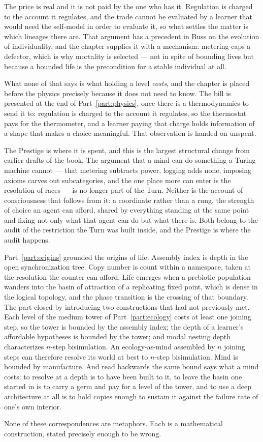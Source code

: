 The price is real and it is not paid by the one who has it.
Regulation is charged to the account it regulates, and the trade cannot
be evaluated by a learner that would need the self-model in order to
evaluate it, so what settles the matter is which lineages there are.
That argument has a precedent in Buss on the evolution of individuality,
and the chapter supplies it with a mechanism: metering caps a defector,
which is why mortality is selected --- not in spite of bounding lives but
because a bounded life is the precondition for a stable individual at
all.

What none of that says is what holding a level \emph{costs}, and the
chapter is placed before the physics precisely because it does not need
to know.
The bill is presented at the end of Part~\ref{part:physics}, once there
is a thermodynamics to send it to: regulation is charged to the account
it regulates, so the thermostat pays for the thermometer, and a learner
paying that charge holds information of a shape that makes a choice
meaningful.
That observation is handed on unspent.

The Prestige is where it is spent, and this is the largest structural
change from earlier drafts of the book.
The argument that a mind can do something a Turing machine cannot ---
that metering subtracts power, logging adds none, imposing axioms carves
out subcategories, and the one place more can enter is the resolution of
races --- is no longer part of the Turn.
Neither is the account of consciousness that follows from it: a
coordinate rather than a rung, the strength of choice an agent can afford,
shared by everything standing at the same point and fixing not only what
that agent can do but what there is.
Both belong to the audit of the restriction the Turn was built inside,
and the Prestige is where the audit happens.

Part~\ref{part:origins} grounded the origins of life.
Assembly index is depth in the open synchronization tree.
Copy number is count within a namespace, taken at the resolution the
counter can afford.
Life emerges when a prebiotic population wanders into the basin of
attraction of a replicating fixed point, which is dense in the logical
topology, and the phase transition is the crossing of that boundary.
The part closed by introducing two constructions that had not previously
met.
Each level of the medium tower of Part~\ref{part:ecology} costs at least
one joining step, so the tower is bounded by the assembly index; the
depth of a learner's affordable hypotheses is bounded by the tower; and
modal nesting depth characterizes $n$-step bisimulation.
An ecology-as-mind assembled by $n$ joining steps can therefore resolve
its world at best to $n$-step bisimulation.
Mind is bounded by manufacture.
And read backwards the same bound says what a mind costs: to resolve at a
depth is to have been built to it, to leave the basin one started in is to
carry a germ and pay for a level of the tower, and to use a deep
architecture at all is to hold copies enough to sustain it against the
failure rate of one's own interior.

None of these correspondences are metaphors.
Each is a mathematical construction, stated precisely enough to be wrong.
